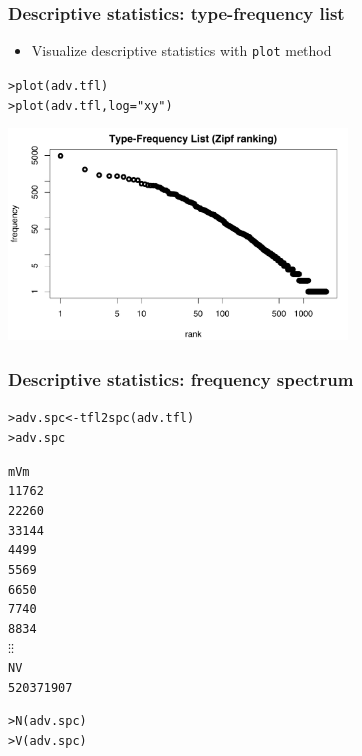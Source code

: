 \documentclass[t]{beamer} %
\begin{document}
\begin{frame}[fragile]
  \frametitle{Descriptive statistics: type-frequency list}

  \begin{itemize}
  \item Visualize descriptive statistics with \texttt{plot} method
  \end{itemize}

\begin{alltt}
> plot(adv.tfl)              
> plot(adv.tfl, log="xy")    
\end{alltt}

  \begin{center}
    \includegraphics[width=9cm]{img/brown_adverbs_tfl}
  \end{center}
\end{frame}

\begin{frame}[fragile]
  \frametitle{Descriptive statistics: frequency spectrum}

  \ungap[1]
\begin{alltt}
> adv.spc <- tfl2spc(adv.tfl)  
> adv.spc \begin{Rout}
    m  Vm
1   1 762
2   2 260
3   3 144
4   4  99
5   5  69
6   6  50
7   7  40
8   8  34
    \(\vdots\)   \(\vdots\)
     N    V
 52037 1907
\end{Rout}
> N(adv.spc)  
> V(adv.spc)  
\end{alltt}
\end{frame}
\end{document}
